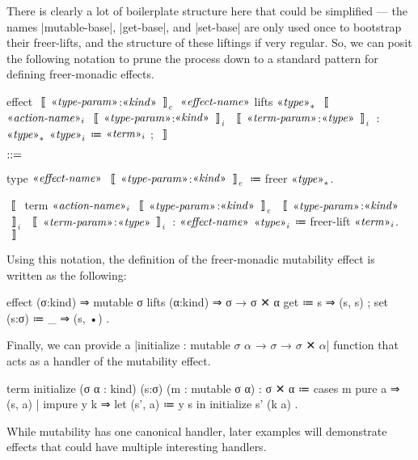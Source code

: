 There is clearly a lot of boilerplate structure here that could be simplified ---
the names \code|mutable-base|, \code|get-base|, and \code|set-base| are only used once to bootstrap their freer-lifts,
and the structure of these liftings if very regular.
So, we can posit the following notation to prune the process down to a standard pattern for defining freer-monadic effects.
%
\newpage
\begin{notational}
effect $〚$$\mvar{type-param}$:$\mvar{kind}$$〛_e$ $\mvar{effect-name}$ lifts $\mvar{type}_*$
  { $〚$ $\mvar{action-name}_i$ $〚$$\mvar{type-param}$:$\mvar{kind}$$〛_i$ $〚$$\mvar{term-param}$:$\mvar{type}$$〛_i$
      : $\mvar{type}_*$ $\mvar{type}_i$
      ≔ $\mvar{term}_i$ ; $〛$ }

$\syneq$

type $\mvar{effect-name}$ $〚$$\mvar{type-param}$:$\mvar{kind}$$〛_e$ ≔ freer $\mvar{type}_*$.

$〚$ term $\mvar{action-name}_i$ $〚$$\mvar{type-param}$:$\mvar{kind}$$〛_e$ $〚$$\mvar{type-param}$:$\mvar{kind}$$〛_i$
          $〚$$\mvar{term-param}$:$\mvar{type}$$〛_i$
    : $\mvar{effect-name}$ $\mvar{type}_i$
    ≔ freer-lift $\mvar{term}_i$. $〛$
\end{notational}
Using this notation, the definition of the freer-monadic mutability effect is written as the following:
\begin{program}[caption={Definitions for the mutability effect}]
effect (σ:kind) ⇒ mutable σ
 lifts (α:kind) ⇒ σ → σ ✕ α
  { get       ≔ s ⇒ (s, s)
  ; set (s:σ) ≔ _ ⇒ (s, •) }.
\end{program}
Finally, we can provide a \code|initialize : mutable $σ$ $α$ → $σ$ → $σ$ ✕ $α$| function that acts as a handler of the mutability effect.
\begin{program}
term initialize (σ α : kind) (s:σ) (m : mutable σ α) : σ ✕ α
  ≔ cases m
      { pure   a   ⇒ (s, a)
      | impure y k ⇒ let (s', a) ≔ y s in initialize s' (k a) }.
\end{program}
While mutability has one canonical handler, later examples will demonstrate effects that could have multiple interesting handlers.

